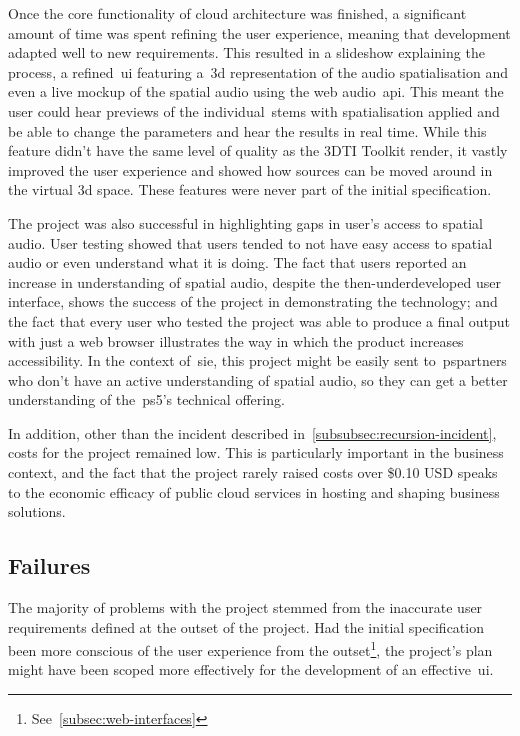 Once the core functionality of cloud architecture was finished,
a significant amount of time was spent refining the user experience,
meaning that development adapted well to new requirements.
This resulted in a slideshow explaining the process,
a refined~\gls{ui} featuring a~\gls{3d} representation of the audio spatialisation and even a live mockup of the spatial audio
using the web audio~\gls{api}.
This meant the user could hear previews of the individual~\glspl{stem} with spatialisation applied
and be able to change the parameters and hear the results in real time.
While this feature didn't have the same level of quality as the 3DTI Toolkit render,
it vastly improved the user experience and showed how sources can be moved around in the virtual 3d space.
These features were never part of the initial specification.

The project was also successful in highlighting gaps in user's access to spatial audio.
User testing showed that users tended to not have easy access to spatial audio or even understand what it is doing.
The fact that users reported an increase in understanding of spatial audio,
despite the then-underdeveloped user interface, shows the success of the project in demonstrating the technology;
and the fact
that every user who tested the project was able
to produce a final output with just a web browser illustrates the way in which the product increases accessibility.
In the context of~\gls{sie},
this project might be easily sent
to~\glspl{pspartner} who don't have an active understanding of spatial audio,
so they can get a better understanding of the~\gls{ps5}'s technical offering.

In addition, other than the incident described in~\ref{subsubsec:recursion-incident},
costs for the project remained low.
This is particularly important in the business context,
and the fact that the project rarely raised costs over \$0.10 USD speaks to the economic efficacy of public cloud services
in hosting and shaping business solutions.

\subsection{Failures}\label{subsec:failures}

The majority of problems with the project stemmed from the inaccurate user requirements
defined at the outset of the project.
Had the initial specification been more conscious of the user experience from the outset\footnote{See~\ref{subsec:web-interfaces}},
the project's plan might have been scoped more effectively for the development of an effective~\gls{ui}.

